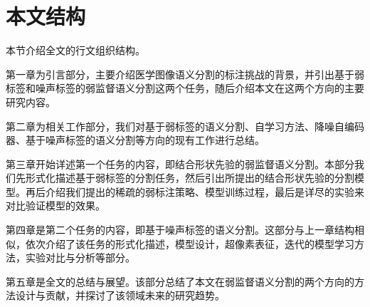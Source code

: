 \section{本文结构}
本节介绍全文的行文组织结构。

第一章为引言部分，主要介绍医学图像语义分割的标注挑战的背景，并引出基于弱标签和噪声标签的弱监督语义分割这两个任务，随后介绍本文在这两个方向的主要研究内容。

第二章为相关工作部分，我们对基于弱标签的语义分割、自学习方法、降噪自编码器、基于噪声标签的语义分割等方向的现有工作进行总结。

第三章开始详述第一个任务的内容，即结合形状先验的弱监督语义分割。本部分我们先形式化描述基于弱标签的分割任务，然后引出所提出的结合形状先验的分割模型。再后介绍我们提出的稀疏的弱标注策略、模型训练过程，最后是详尽的实验来对比验证模型的效果。

第四章是第二个任务的内容，即基于噪声标签的语义分割。这部分与上一章结构相似，依次介绍了该任务的形式化描述，模型设计，超像素表征，迭代的模型学习方法，实验对比与分析等部分。

第五章是全文的总结与展望。该部分总结了本文在弱监督语义分割的两个方向的方法设计与贡献，并探讨了该领域未来的研究趋势。